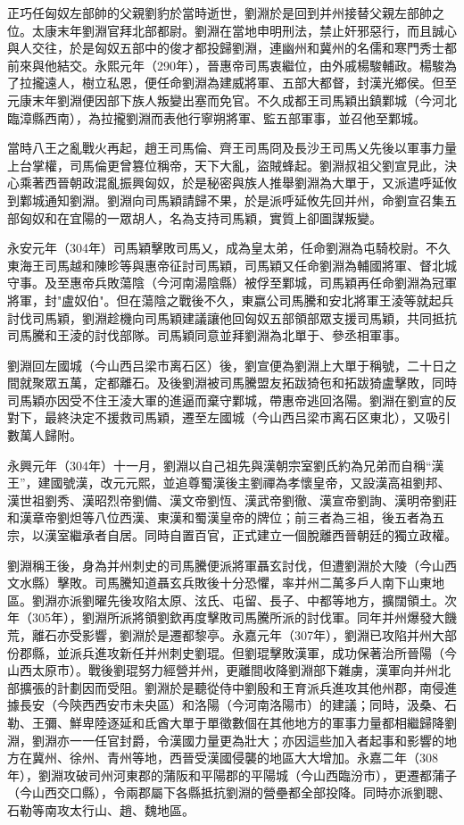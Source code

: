 正巧任匈奴左部帥的父親劉豹於當時逝世，劉淵於是回到并州接替父親左部帥之位。太康末年劉淵官拜北部都尉。劉淵在當地申明刑法，禁止奸邪惡行，而且誠心與人交往，於是匈奴五部中的俊才都投歸劉淵，連幽州和冀州的名儒和寒門秀士都前來與他結交。永熙元年（290年），晉惠帝司馬衷繼位，由外戚楊駿輔政。楊駿為了拉攏遠人，樹立私恩，便任命劉淵為建威將軍、五部大都督，封漢光鄉侯。但至元康末年劉淵便因部下族人叛變出塞而免官。不久成都王司馬穎出鎮鄴城（今河北臨漳縣西南），為拉攏劉淵而表他行寧朔將軍、監五部軍事，並召他至鄴城。

當時八王之亂戰火再起，趙王司馬倫、齊王司馬冏及長沙王司馬乂先後以軍事力量上台掌權，司馬倫更曾篡位稱帝，天下大亂，盜賊蜂起。劉淵叔祖父劉宣見此，決心乘著西晉朝政混亂振興匈奴，於是秘密與族人推舉劉淵為大單于，又派遣呼延攸到鄴城通知劉淵。劉淵向司馬穎請歸不果，於是派呼延攸先回并州，命劉宣召集五部匈奴和在宜陽的一眾胡人，名為支持司馬穎，實質上卻圖謀叛變。

永安元年（304年）司馬穎擊敗司馬乂，成為皇太弟，任命劉淵為屯騎校尉。不久東海王司馬越和陳昣等與惠帝征討司馬穎，司馬穎又任命劉淵為輔國將軍、督北城守事。及至惠帝兵敗蕩陰（今河南湯陰縣）被俘至鄴城，司馬穎再任命劉淵為冠軍將軍，封"盧奴伯"。但在蕩陰之戰後不久，東嬴公司馬騰和安北將軍王淩等就起兵討伐司馬穎，劉淵趁機向司馬穎建議讓他回匈奴五部領部眾支援司馬穎，共同抵抗司馬騰和王淩的討伐部隊。司馬穎同意並拜劉淵為北單于、參丞相軍事。

劉淵回左國城（今山西吕梁市离石区）後，劉宣便為劉淵上大單于稱號，二十日之間就聚眾五萬，定都離石。及後劉淵被司馬騰盟友拓跋猗㐌和拓跋猗盧擊敗，同時司馬穎亦因受不住王淩大軍的進逼而棄守鄴城，帶惠帝逃回洛陽。劉淵在劉宣的反對下，最終決定不援救司馬穎，遷至左國城（今山西吕梁市离石区東北），又吸引數萬人歸附。

永興元年（304年）十一月，劉淵以自己祖先與漢朝宗室劉氏約為兄弟而自稱“漢王”，建國號漢，改元元熙，並追尊蜀漢後主劉禪為孝懷皇帝，又設漢高祖劉邦、漢世祖劉秀、漢昭烈帝劉備、漢文帝劉恆、漢武帝劉徹、漢宣帝劉詢、漢明帝劉莊和漢章帝劉炟等八位西漢、東漢和蜀漢皇帝的牌位；前三者為三祖，後五者為五宗，以漢室繼承者自居。同時自置百官，正式建立一個脫離西晉朝廷的獨立政權。

劉淵稱王後，身為并州刺史的司馬騰便派將軍聶玄討伐，但遭劉淵於大陵（今山西文水縣）擊敗。司馬騰知道聶玄兵敗後十分恐懼，率并州二萬多戶人南下山東地區。劉淵亦派劉曜先後攻陷太原、泫氏、屯留、長子、中都等地方，擴闊領土。次年（305年），劉淵所派將領劉欽再度擊敗司馬騰所派的討伐軍。同年并州爆發大饑荒，離石亦受影響，劉淵於是遷都黎亭。永嘉元年（307年），劉淵已攻陷并州大部份郡縣，並派兵進攻新任并州刺史劉琨。但劉琨擊敗漢軍，成功保著治所晉陽（今山西太原市）。戰後劉琨努力經營并州，更離間收降劉淵部下雜虜，漢軍向并州北部擴張的計劃因而受阻。劉淵於是聽從侍中劉殷和王育派兵進攻其他州郡，南侵進據長安（今陝西西安市未央區）和洛陽（今河南洛陽市）的建議；同時，汲桑、石勒、王彌、鮮卑陸逐延和氐酋大單于單徵數個在其他地方的軍事力量都相繼歸降劉淵，劉淵亦一一任官封爵，令漢國力量更為壯大；亦因這些加入者起事和影響的地方在冀州、徐州、青州等地，西晉受漢國侵襲的地區大大增加。永嘉二年（308年），劉淵攻破司州河東郡的蒲阪和平陽郡的平陽城（今山西臨汾市），更遷都蒲子（今山西交口縣），令兩郡屬下各縣抵抗劉淵的營壘都全部投降。同時亦派劉聰、石勒等南攻太行山、趙、魏地區。

